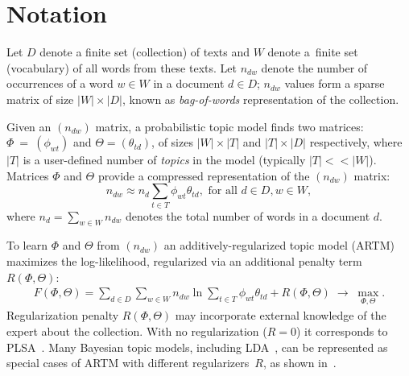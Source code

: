 \documentclass[russian,english]{llncs}
\begin{document}

\section{Notation}
\label{sec:Notation}

Let
$D$ denote a finite set (collection) of texts and
$W$ denote a~finite set (vocabulary) of all words from these texts.
Let
$n_{dw}$ denote the number of occurrences of a word $w \in W$ in a document $d \in D$;
$n_{dw}$ values form a sparse matrix of size $|W| \times |D|$,
known as \emph{bag-of-words} representation of the collection.

Given an $(n_{dw})$ matrix, a probabilistic topic model finds two matrices:
$\Phi~=~(\phi_{wt})$ and $\Theta = (\theta_{td})$,
of sizes $|W| \times |T|$ and $|T| \times |D|$ respectively,
where $|T|$ is a user-defined number of \emph{topics} in the model (typically $|T| << |W|$).
Matrices $\Phi$ and $\Theta$
provide a compressed representation of the $(n_{dw})$ matrix:
\[
n_{dw} \approx n_d \sum_{t \in T} \phi_{wt} \theta_{td}, \text { for all } d \in D, w \in W,
\]
where $n_d = \sum_{w \in W} n_{dw}$ denotes the total number of words in a document $d$.

To learn $\Phi$ and $\Theta$ from $(n_{dw})$ an additively-regularized topic model (ARTM) maximizes
the log-likelihood, regularized via an additional penalty term $R(\Phi, \Theta)$:
\begin{gather}
\label{eq:ARTM}
    F(\Phi, \Theta) = \sum_{d\in D}\sum_{w\in W} n_{dw} \ln \sum_{t\in T} \phi_{wt} \theta_{td} + R(\Phi, \Theta)
    \;\to\; \max_{\Phi,\Theta}.
\end{gather}
Regularization penalty $R(\Phi, \Theta)$ may incorporate external knowledge
of the expert about the collection.
With no regularization (${R=0}$) it corresponds to PLSA~\cite{hofmann99plsi}.
Many Bayesian topic models, including LDA~\cite{blei03latent}, can be represented
as special cases of ARTM with different regularizers~$R$,
as shown in~\cite{voron14aist,voron15mlj}.
\end{document}
